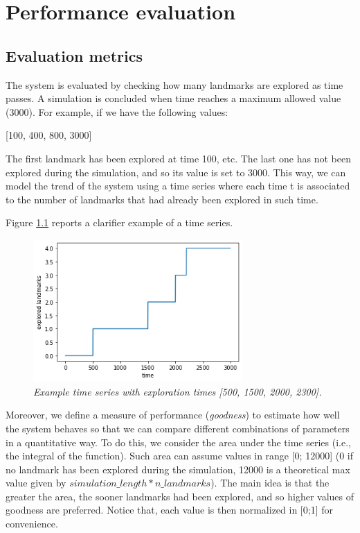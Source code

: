 \chapter{Performance evaluation}

\section{Evaluation metrics}

The system is evaluated by checking how many landmarks are explored as time passes. A simulation is concluded when time reaches a maximum allowed value (3000). For example, if we have the following values:

\begin{center}
[100, 400, 800, 3000]
\end{center}

\noindent
The first landmark has been explored at time 100, etc. The last one has not been explored during the simulation, and so its value is set to 3000. This way, we can model the trend of the system using a time series where each time t is associated to the number of landmarks that had already been explored in such time. 

\noindent
Figure \ref{fig:ts} reports a clarifier example of a time series.

\begin{figure}[H]
\centering
\includegraphics[width=8cm, keepaspectratio]{images/ts.png}
\caption{\textit{Example time series with exploration times [500, 1500, 2000, 2300].}}
\label{fig:ts}
\end{figure}

\smallskip
Moreover, we define a measure of performance (\textit{goodness}) to estimate how well the system behaves so that we can compare different combinations of parameters in a quantitative way. To do this, we consider the area under the time series (i.e., the integral of the function). Such area can assume values in range [0; 12000] (0 if no landmark has been explored during the simulation, 12000 is a theoretical max value given by $simulation\_length * n\_landmarks$). The main idea is that the greater the area, the sooner landmarks had been explored, and so higher values of goodness are preferred. Notice that, each value is then normalized in [0;1] for convenience.


